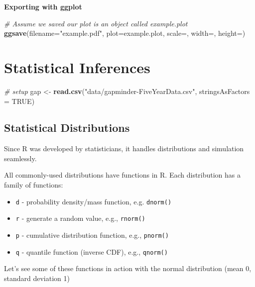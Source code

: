 \documentclass[]{book}
\newenvironment{Shaded}{\begin{snugshade}}{\end{snugshade}}
\newcommand{\KeywordTok}[1]{\textcolor[rgb]{0.13,0.29,0.53}{\textbf{#1}}}
\newcommand{\DataTypeTok}[1]{\textcolor[rgb]{0.13,0.29,0.53}{#1}}
\newcommand{\StringTok}[1]{\textcolor[rgb]{0.31,0.60,0.02}{#1}}
\newcommand{\CommentTok}[1]{\textcolor[rgb]{0.56,0.35,0.01}{\textit{#1}}}
\newcommand{\OtherTok}[1]{\textcolor[rgb]{0.56,0.35,0.01}{#1}}
\newcommand{\NormalTok}[1]{#1}
\providecommand{\tightlist}{%
  \setlength{\itemsep}{0pt}\setlength{\parskip}{0pt}}
\begin{document}
\textbf{Exporting with ggplot}

\begin{Shaded}
\begin{Highlighting}[]
\CommentTok{# Assume we saved our plot is an object called example.plot}
\KeywordTok{ggsave}\NormalTok{(}\DataTypeTok{filename=}\StringTok{"example.pdf"}\NormalTok{, }\DataTypeTok{plot=}\NormalTok{example.plot, }\DataTypeTok{scale=}\NormalTok{, }\DataTypeTok{width=}\NormalTok{, }\DataTypeTok{height=}\NormalTok{)}
\end{Highlighting}
\end{Shaded}

\chapter{Statistical Inferences}\label{statistical-inferences}

\begin{Shaded}
\begin{Highlighting}[]
\CommentTok{# setup}
\NormalTok{gap <-}\StringTok{ }\KeywordTok{read.csv}\NormalTok{(}\StringTok{"data/gapminder-FiveYearData.csv"}\NormalTok{, }\DataTypeTok{stringsAsFactors =} \OtherTok{TRUE}\NormalTok{)}
\end{Highlighting}
\end{Shaded}

\section{Statistical Distributions}\label{statistical-distributions}

Since R was developed by statisticians, it handles distributions and
simulation seamlessly.

All commonly-used distributions have functions in R. Each distribution
has a family of functions:

\begin{itemize}
\tightlist
\item
  \texttt{d} - probability density/mass function, e.g. \texttt{dnorm()}
\item
  \texttt{r} - generate a random value, e.g., \texttt{rnorm()}
\item
  \texttt{p} - cumulative distribution function, e.g., \texttt{pnorm()}
\item
  \texttt{q} - quantile function (inverse CDF), e.g., \texttt{qnorm()}
\end{itemize}

Let's see some of these functions in action with the normal distribution
(mean 0, standard deviation 1)
\end{document}
